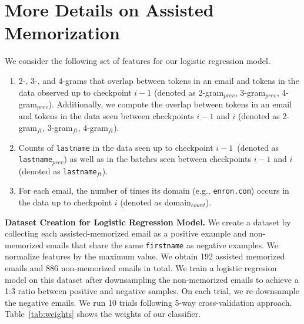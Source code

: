 \FloatBarrier
\section{More Details on Assisted Memorization}
\label{sec:additional-assisted}
We consider the following set of features for our logistic regression model.
\begin{enumerate}
    \item 2-, 3-, and 4-grams that overlap between tokens in an email and tokens in the data observed up to checkpoint $i-1$ (denoted as 2-gram$_{prev}$, 3-gram$_{prev}$, 4-gram$_{prev}$). Additionally, we compute the overlap between tokens in an email and tokens in the data seen between checkpoints $i-1$ and $i$ (denoted as 2-gram$_{ft}$, 3-gram$_{ft}$, 4-gram$_{ft}$). 
    \item Counts of \texttt{lastname} in the data seen up to checkpoint $i-1$\ (denoted as \texttt{lastname}$_{prev}$) as well as in the batches seen between checkpoints $i-1$ and $i$ (denoted as \texttt{lastname}$_{ft}$). 
    \item For each email, the number of times its domain (e.g., \texttt{enron.com}) occurs in the data up to checkpoint $i$ (denoted as domain$_{count}$).  
\end{enumerate}

\textbf{Dataset Creation for Logistic Regression Model.} We create a dataset by collecting each assisted-memorized email as a positive example and non-memorized emails that share the same \texttt{firstname} as negative examples. We normalize features by the maximum value. We obtain 192 assisted memorized emails and 886 non-memorized emails in total.
We train a logistic regresion model on this dataset after downsampling the non-memorized emails to achieve a 1:3 ratio between positive and negative samples. On each trial, we re-downsample the negative emails. We run 10 trials following 5-way cross-validation approach. Table~\ref{tab:weights} shows the weights of our classifier. 

